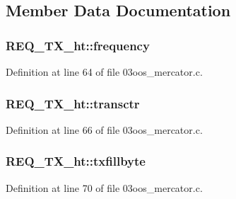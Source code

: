 \subsection{Member Data Documentation}
\subsubsection[{\texorpdfstring{frequency}{frequency}}]{ R\+E\+Q\+\_\+\+T\+X\+\_\+ht\+::frequency}\hypertarget{struct_r_e_q___t_x__ht_a74c294feb13b830ee7158ad22ee13300}{}\label{struct_r_e_q___t_x__ht_a74c294feb13b830ee7158ad22ee13300}


Definition at line 64 of file 03oos\+\_\+mercator.\+c.

\subsubsection[{\texorpdfstring{transctr}{transctr}}]{ R\+E\+Q\+\_\+\+T\+X\+\_\+ht\+::transctr}\hypertarget{struct_r_e_q___t_x__ht_a4c78ef7cfae1a8937177c1cc2295636a}{}\label{struct_r_e_q___t_x__ht_a4c78ef7cfae1a8937177c1cc2295636a}


Definition at line 66 of file 03oos\+\_\+mercator.\+c.

\subsubsection[{\texorpdfstring{txfillbyte}{txfillbyte}}]{ R\+E\+Q\+\_\+\+T\+X\+\_\+ht\+::txfillbyte}\hypertarget{struct_r_e_q___t_x__ht_ab8913f4c071c5009e6c05ea46cd40e65}{}\label{struct_r_e_q___t_x__ht_ab8913f4c071c5009e6c05ea46cd40e65}


Definition at line 70 of file 03oos\+\_\+mercator.\+c.

